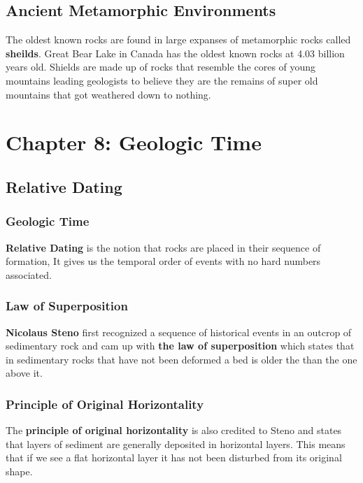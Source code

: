 \documentclass{article}
\begin{document}
\subsection{Ancient Metamorphic Environments} %
\label{sub:ancient_metamorphic_environments}
The oldest known rocks are found in large expanses of metamorphic rocks called \textbf{sheilds}. Great Bear Lake in Canada has the oldest known rocks at 4.03 billion years old. Shields are made up of rocks that resemble the cores of young mountains leading geologists to believe they are the remains of super old mountains that got weathered down to nothing.



\section{Chapter 8: Geologic Time} %
\label{sec:chapter_8_geologic_time}
\subsection{Relative Dating} %
\label{sub:relative_dating}
\subsubsection{Geologic Time} %
\label{subsub:geologic_time}
\textbf{Relative Dating} is the notion that rocks are placed in their sequence of formation, It gives us the temporal order of events with no hard numbers associated.

\subsubsection{Law of Superposition} %
\label{sub:law_of_superposition}
\textbf{Nicolaus Steno} first recognized a sequence of historical events in an outcrop of sedimentary rock and cam up with \textbf{the law of superposition} which states that in sedimentary rocks that have not been deformed a bed is older the than the one above it.

\subsubsection{Principle of Original Horizontality} %
\label{sub:principle_of_original_horizontality}
The \textbf{principle of original horizontality} is also credited to Steno and states that layers of sediment are generally deposited in horizontal layers. This means that if we see a flat horizontal layer it has not been disturbed from its original shape.
\end{document}
